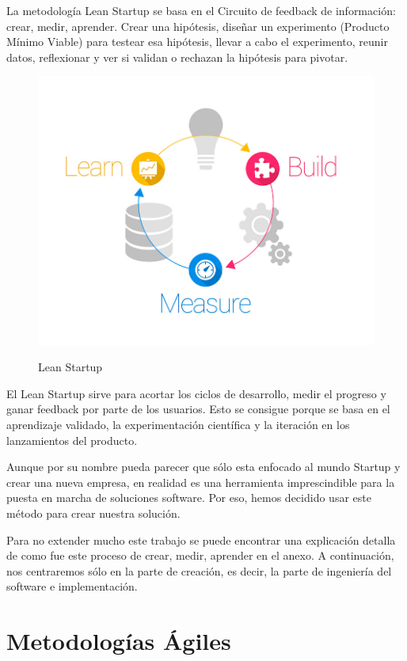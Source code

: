 \documentclass[12pt,twoside,titlepage]{report}
\begin{document}
La metodología Lean Startup se basa en el Circuito de feedback de información: crear, medir, aprender. Crear una hipótesis, diseñar un experimento (Producto Mínimo Viable) para testear esa hipótesis, llevar a cabo el experimento, reunir datos, reflexionar y ver si validan o rechazan la hipótesis para pivotar.

\begin{figure}[H]
    \centering
    \includegraphics[scale=0.3]{Lean Startup/CircuitoFeedback}
    \label{fig:LeanStartup}
    \caption{Lean Startup}
\end{figure}

El Lean Startup sirve para acortar los ciclos de desarrollo, medir el progreso y ganar feedback por parte de los usuarios. Esto se consigue porque se basa en el aprendizaje validado, la experimentación científica y la iteración en los lanzamientos del producto. 

Aunque por su nombre pueda parecer que sólo esta enfocado al mundo Startup y crear una nueva empresa, en realidad es una herramienta imprescindible para la puesta en marcha de soluciones software. Por eso, hemos decidido usar este método para crear nuestra solución.

Para no extender mucho este trabajo se puede encontrar una explicación detalla de como fue este proceso de crear, medir, aprender en el anexo. A continuación, nos centraremos sólo en la parte de creación, es decir, la parte de ingeniería del software e implementación.

\chapter{Metodologías Ágiles}
\end{document}
